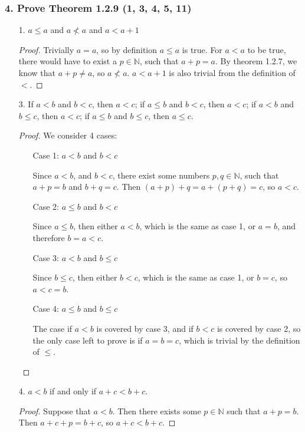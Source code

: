 \documentclass{article}
\newcommand{\N}{\mathbb{N}}
\begin{document}
\subsubsection*{4. Prove Theorem 1.2.9 (1, 3, 4, 5, 11)}

\begin{enumerate}
	\item[1. ] $a \le a$ and $a \nless a$ and $a < a + 1$
	\begin{proof}
		Trivially $a = a$, so by definition $a \le a$ is true. For $a < a$ to be true, there would have to exist a $p \in \N$, such that $a + p = a$. By theorem 1.2.7, we know that $a + p \ne a$, so $a \nless a$. $a < a+1$ is also trivial from the definition of $<$.
	\end{proof}
	\item[3. ] If $a < b$ and $b < c$, then $a < c$; if $a \le b$ and $b < c$, then $a < c$; if $a < b$ and $b \le c$, then $a < c$; if $a \le b$ and $b \le c$, then $a \le c$.
	\begin{proof}
		We consider 4 cases:
		
		\begin{enumerate}
			\item[Case 1:] $a < b$ and $b < c$
			
			Since $a < b$, and $b < c$, there exist some numbers $p,q \in \N$, such that $a + p = b$ and $b + q = c$. Then $(a + p) + q = a + (p + q) = c$, so $a < c$.
			\item[Case 2:] $a \le b$ and $b < c$
			
			Since $a \le b$, then either $a < b$, which is the same as case 1, or $a = b$, and therefore $b = a < c$.
			\item[Case 3:] $a < b$ and $b \le c$
			
			Since $b \le c$, then either $b < c$, which is the same as case 1, or $b = c$, so $a < c = b$.

			\item[Case 4:] $a \le b$ and $b \le c$
			
			The case if $a < b$ is covered by case 3, and if $b < c$ is covered by case 2, so the only case left to prove is if $a = b = c$, which is trivial by the definition of $\le$.
		\end{enumerate}
	\end{proof}
	\item[4. ] $a < b$ if and only if $a + c < b + c$.
	\begin{proof}
		Suppose that $a < b$. Then there exists some $p \in \N$ such that $a + p = b$. Then $a + c + p = b + c$, so $a + c < b + c$.


\end{proof}
\end{enumerate}
\end{document}
